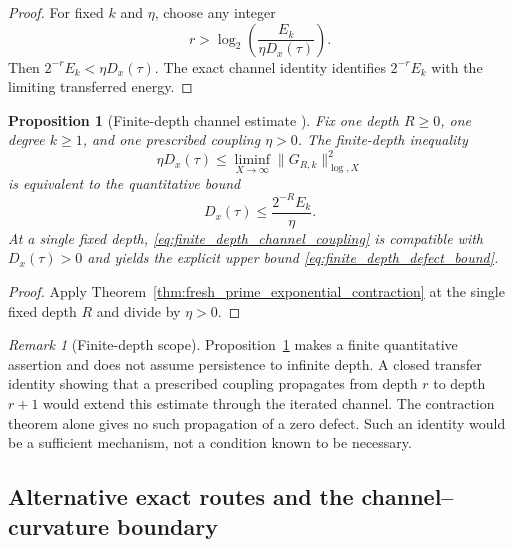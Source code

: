 \documentclass[11pt]{amsart}
\numberwithin{equation}{section}
\theoremstyle{plain}
\newtheorem{proposition}[theorem]{Proposition}
\theoremstyle{definition}
\theoremstyle{remark}
\newtheorem{remark}[theorem]{Remark}
\begin{document}
\begin{proof}
For fixed $k$ and $\eta$, choose any integer
\begin{equation}
r>\log_2\!\left(\frac{E_k}{\eta D_x(\tau)}\right).
\label{eq:explicit_failure_depth}
\end{equation}
Then $2^{-r}E_k<\eta D_x(\tau)$.  The exact channel identity identifies $2^{-r}E_k$ with the limiting transferred energy.
\end{proof}

\begin{proposition}[Finite-depth channel estimate {}]
\label{prop:finite_depth_channel_estimate}
Fix one depth $R\geq0$, one degree $k\geq1$, and one prescribed coupling $\eta>0$.  The finite-depth inequality
\begin{equation}
\eta D_x(\tau)
\leq
\liminf_{X\to\infty}\|G_{R,k}\|_{\log,X}^2
\label{eq:finite_depth_channel_coupling}
\end{equation}
is equivalent to the quantitative bound
\begin{equation}
D_x(\tau)\leq\frac{2^{-R}E_k}{\eta}.
\label{eq:finite_depth_defect_bound}
\end{equation}
At a single fixed depth, \eqref{eq:finite_depth_channel_coupling} is compatible with $D_x(\tau)>0$ and yields the explicit upper bound \eqref{eq:finite_depth_defect_bound}.
\end{proposition}

\begin{proof}
Apply Theorem~\ref{thm:fresh_prime_exponential_contraction} at the single fixed depth $R$ and divide by $\eta>0$.
\end{proof}

\begin{remark}[Finite-depth scope]
\label{rem:changing_depth_quantifiers}
Proposition~\ref{prop:finite_depth_channel_estimate} makes a finite quantitative assertion and does not assume persistence to infinite depth.  A closed transfer identity showing that a prescribed coupling propagates from depth $r$ to depth $r+1$ would extend this estimate through the iterated channel.  The contraction theorem alone gives no such propagation of a zero defect.  Such an identity would be a sufficient mechanism, not a condition known to be necessary.
\end{remark}

\subsection{Alternative exact routes and the channel--curvature boundary}
\label{subsec:alternative_routes_channel_boundary}
\end{document}
